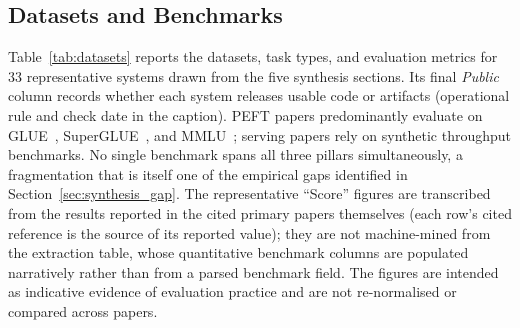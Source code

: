 \subsection{Datasets and Benchmarks}
\label{sec:methodology:datasets}

Table~\ref{tab:datasets} reports the datasets, task types, and evaluation
metrics for 33 representative systems drawn from the five synthesis sections.
Its final \emph{Public} column records whether each system releases usable code
or artifacts (operational rule and check date in the caption).
PEFT papers predominantly evaluate on GLUE~\cite{WangGLUE2018},
SuperGLUE~\cite{WangSuperGLUE2019}, and MMLU~\cite{HendrycksMMLU2021};
serving papers rely on synthetic throughput benchmarks. No single benchmark
spans all three pillars simultaneously, a fragmentation that is itself one
of the empirical gaps identified in Section~\ref{sec:synthesis_gap}. The
representative ``Score'' figures are transcribed from the results reported in
the cited primary papers themselves (each row's cited reference is the source
of its reported value); they are not machine-mined from the extraction table,
whose quantitative benchmark columns are populated narratively rather than
from a parsed benchmark field. The figures are intended as indicative evidence
of evaluation practice and are not re-normalised or compared across papers.

